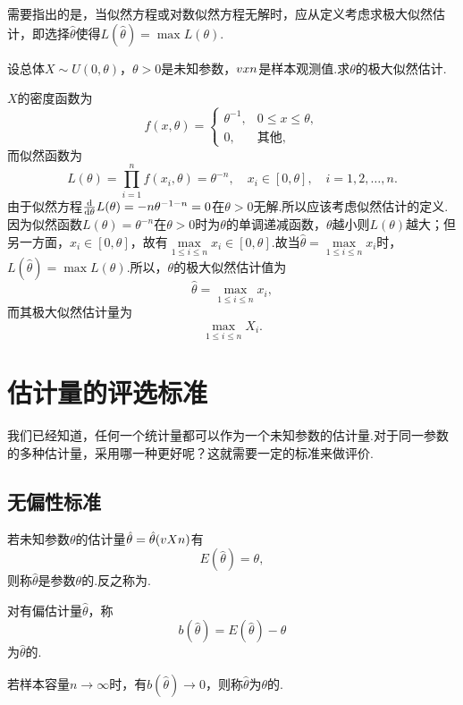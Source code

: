 需要指出的是，当似然方程或对数似然方程无解时，应从定义考虑求极大似然估计，即选择\(\hat{\theta}\)使得\(L(\hat{\theta})=\max L(\theta)\).

\begin{example}
设总体\(X \sim U(0,\theta)\)，\(\theta>0\)是未知参数，\(v{x}{n}\)是样本观测值.求\(\theta\)的极大似然估计.
\begin{solution}
\(X\)的密度函数为\[
f(x,\theta) = \left\{ \begin{array}{cl}
\theta^{-1}, & 0 \leqslant x \leqslant \theta, \\
0, & \text{其他},
\end{array} \right.
\]而似然函数为\[
L(\theta) = \prod\limits_{i=1}^n{f(x_i,\theta)} = \theta^{-n},
\quad x_i \in [0,\theta], \quad i=1,2,\dotsc,n.
\]由于似然方程\(\dv{\theta} L(\theta) = -n\theta^{-1-n} = 0\)在\(\theta>0\)无解.所以应该考虑似然估计的定义.因为似然函数\(L(\theta)=\theta^{-n}\)在\(\theta>0\)时为\(\theta\)的单调递减函数，\(\theta\)越小则\(L(\theta)\)越大；但另一方面，\(x_i\in[0,\theta]\)，故有\(\max\limits_{1 \leqslant i \leqslant n} x_i \in [0,\theta]\).故当\(\hat{\theta}=\max\limits_{1 \leqslant i \leqslant n} x_i\)时，\(L(\hat{\theta})=\max L(\theta)\).所以，\(\theta\)的极大似然估计值为\[
\hat{\theta} = \max\limits_{1 \leqslant i \leqslant n} x_i,
\]而其极大似然估计量为\[
\max\limits_{1 \leqslant i \leqslant n} X_i.
\]
\end{solution}
\end{example}

\section{估计量的评选标准}
我们已经知道，任何一个统计量都可以作为一个未知参数的估计量.对于同一参数的多种估计量，采用哪一种更好呢？这就需要一定的标准来做评价.

\subsection{无偏性标准}
\begin{definition}
若未知参数\(\theta\)的估计量\(\hat{\theta}=\hat{\theta}(v{X}{n})\)有\[
E(\hat{\theta})=\theta,
\]则称\(\hat{\theta}\)是参数\(\theta\)的.反之称为.

对有偏估计量\(\hat{\theta}\)，称\[
b(\hat{\theta}) = E(\hat{\theta}) - \theta
\]为\(\hat{\theta}\)的.

若样本容量\(n\to\infty\)时，有\(b(\hat{\theta})\to0\)，则称\(\hat{\theta}\)为\(\theta\)的.
\end{definition}


